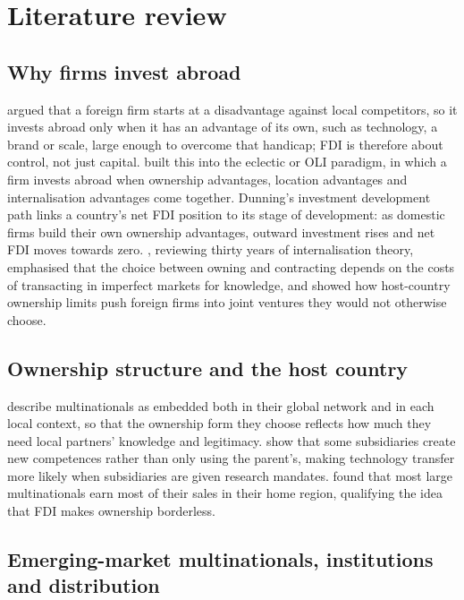 \documentclass[sn-basic]{sn-jnl}
\begin{document}
\section{Literature review}\label{sec:lit}

\subsection{Why firms invest abroad}

\citet{hymer1976} argued that a foreign firm starts at a disadvantage against local competitors, so it invests abroad only when it has an advantage of its own, such as technology, a brand or scale, large enough to overcome that handicap; FDI is therefore about control, not just capital. \citet{dunning2000} built this into the eclectic or OLI paradigm, in which a firm invests abroad when ownership advantages, location advantages and internalisation advantages come together. Dunning's investment development path \citep{dunning1981} links a country's net FDI position to its stage of development: as domestic firms build their own ownership advantages, outward investment rises and net FDI moves towards zero. \citet{buckley2009}, reviewing thirty years of internalisation theory, emphasised that the choice between owning and contracting depends on the costs of transacting in imperfect markets for knowledge, and \citet{caves1996} showed how host-country ownership limits push foreign firms into joint ventures they would not otherwise choose.

\subsection{Ownership structure and the host country}

\citet{meyer2011} describe multinationals as embedded both in their global network and in each local context, so that the ownership form they choose reflects how much they need local partners' knowledge and legitimacy. \citet{cantwell2005} show that some subsidiaries create new competences rather than only using the parent's, making technology transfer more likely when subsidiaries are given research mandates. \citet{rugman2004} found that most large multinationals earn most of their sales in their home region, qualifying the idea that FDI makes ownership borderless.

\subsection{Emerging-market multinationals, institutions and distribution}
\end{document}
